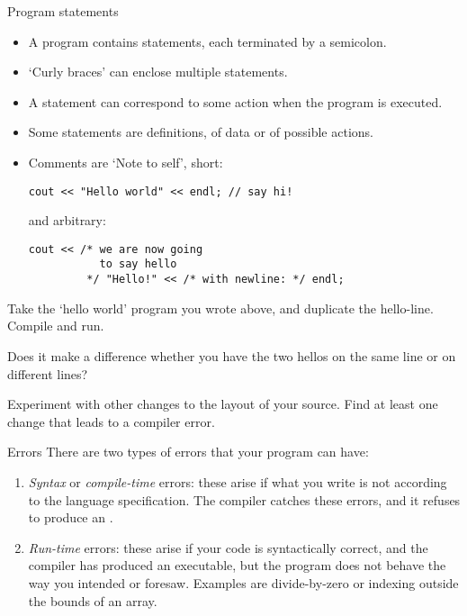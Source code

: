 \begin{block}{Program statements}
  \label{sl:cstatement}
  \begin{itemize}
  \item
    A program contains statements, each terminated by a semicolon.
  \item `Curly braces' can enclose multiple statements.
  \item A statement can correspond to some action when the program is
    executed.
  \item Some statements are definitions, of data or of possible actions.
  \item Comments are `Note to self', short:
\begin{lstlisting}
cout << "Hello world" << endl; // say hi!
\end{lstlisting}
and arbitrary:
\begin{lstlisting}
cout << /* we are now going
           to say hello
         */ "Hello!" << /* with newline: */ endl;
\end{lstlisting}
  \end{itemize}
\end{block}

\begin{exercise}
  \label{ex:hello-line}
  Take the `hello world' program you wrote above, and duplicate the
  hello-line. Compile and run.

  Does it make a difference whether you have the two hellos on the
  same line or on different lines?

  Experiment with other changes to the layout of your source. Find at
  least one change that leads to a compiler error.
\end{exercise}

\begin{block}{Errors}
  \label{sl:program-errors}
  There are two types of errors that your program can have:
  \begin{enumerate}
  \item \emph{Syntax} or
    \emph{compile-time} errors: these arise
    if what you write is not according to the language specification.
    The compiler catches these errors, and it refuses to produce an
    .
  \item \emph{Run-time} errors: these arise if
    your code is syntactically correct, and the compiler has produced
    an executable, but the program does not behave the way you
    intended or foresaw. Examples are divide-by-zero or indexing
    outside the bounds of an array.
  \end{enumerate}
\end{block}

